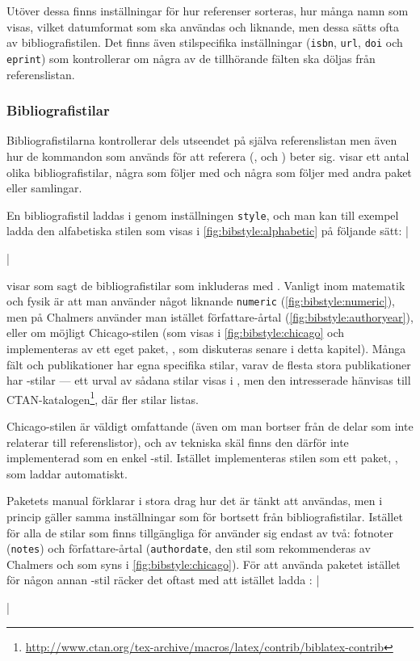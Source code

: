 \documentclass[lang=sv,ptsize=10pt,font=none,nomath,titles=bf,../../a4.tex]{subfiles}
\begin{document}
Utöver dessa finns inställningar för hur referenser sorteras, hur många
namn som visas, vilket datumformat som ska användas och liknande, men
dessa sätts ofta av bibliografistilen.
Det finns även stilspecifika inställningar (\texttt{isbn}, \texttt{url},
\texttt{doi} och \texttt{eprint}) som kontrollerar om några av de
tillhörande fälten ska döljas från referenslistan.

\subsubsection{Bibliografistilar}
Bibliografistilarna kontrollerar dels utseendet på själva referenslistan
men även hur de kommandon som används för att referera (,
 och ) beter sig.
 visar ett antal olika
bibliografistilar, några som följer med  och några som
följer med andra paket eller samlingar.

En bibliografistil laddas i  genom inställningen
\texttt{style}, och man kan till exempel ladda den alfabetiska stilen
som visas i \cref{fig:bibstyle:alphabetic} på följande sätt:
\latex|\usepackage[style=alphabetic]{biblatex}|

 visar som sagt de bibliografistilar som inkluderas
med . Vanligt inom matematik och fysik är att man använder
något liknande \texttt{numeric} (\cref{fig:bibstyle:numeric}), men på
Chalmers använder man istället författare-årtal
(\cref{fig:bibstyle:authoryear}), eller om möjligt Chicago-stilen
(som visas i \cref{fig:bibstyle:chicago} och implementeras av ett eget
paket, , som diskuteras senare i detta kapitel).
Många fält och publikationer har egna specifika stilar, varav de flesta
stora publikationer har -stilar — ett urval av sådana
stilar visas i , men den intresserade hänvisas till
CTAN-katalogen\footnote{\url{http://www.ctan.org/tex-archive/macros/latex/contrib/biblatex-contrib}}, där fler stilar listas.

Chicago-stilen \parencite{Chicago10} är väldigt omfattande (även om man
bortser från de delar som inte relaterar till referenslistor), och av
tekniska skäl finns den därför inte implementerad som en enkel
-stil. Istället implementeras stilen som ett paket,
, som laddar  automatiskt.

Paketets manual \parencite{Fussner13} förklarar i stora drag hur det
är tänkt att användas, men i princip gäller samma inställningar som
för  bortsett från bibliografistilar. Istället för alla
de stilar som finns tillgängliga för  använder sig
 endast av två: fotnoter (\texttt{notes})
och författare-årtal (\texttt{authordate}, den stil som rekommenderas
av Chalmers och som syns i \cref{fig:bibstyle:chicago}).
För att använda paketet istället för någon annan -stil
räcker det oftast med att istället ladda :
\latex|\usepackage[authordate,backend=biber]{biblatex-chicago}|
\end{document}
